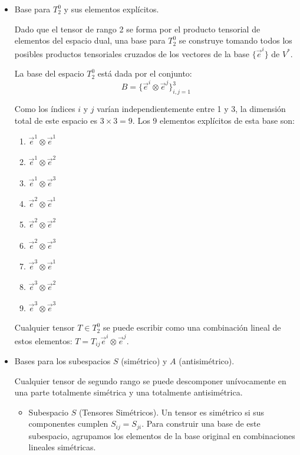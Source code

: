 \documentclass[11pt,spanish]{article}
\begin{document}
\begin{itemize}
\item[a)] Base para $T_2^0$ y sus elementos explícitos.

Dado que el tensor de rango 2 se forma por el producto tensorial de elementos del espacio dual, una base para $T_2^0$ se construye tomando todos los posibles productos tensoriales cruzados de los vectores de la base $\{\vec{e}^i\}$ de $V^*$.

La base del espacio $T_2^0$ está dada por el conjunto:
$$B = \{ \vec{e}^i \otimes \vec{e}^j \}_{i,j=1}^3$$

Como los índices $i$ y $j$ varían independientemente entre 1 y 3, la dimensión total de este espacio es $3 \times 3 = 9$. Los 9 elementos explícitos de esta base son:
\begin{enumerate}
\item $\vec{e}^1 \otimes \vec{e}^1$
\item $\vec{e}^1 \otimes \vec{e}^2$
\item $\vec{e}^1 \otimes \vec{e}^3$
\item $\vec{e}^2 \otimes \vec{e}^1$
\item $\vec{e}^2 \otimes \vec{e}^2$
\item $\vec{e}^2 \otimes \vec{e}^3$
\item $\vec{e}^3 \otimes \vec{e}^1$
\item $\vec{e}^3 \otimes \vec{e}^2$
\item $\vec{e}^3 \otimes \vec{e}^3$
\end{enumerate}

Cualquier tensor $T \in T_2^0$ se puede escribir como una combinación lineal de estos elementos: $T = T_{ij} \vec{e}^i \otimes \vec{e}^j$.

\item[b)] Bases para los subespacios $S$ (simétrico) y $A$ (antisimétrico).

Cualquier tensor de segundo rango se puede descomponer unívocamente en una parte totalmente simétrica y una totalmente antisimétrica. 

\begin{itemize}
\item Subespacio $S$ (Tensores Simétricos).
Un tensor es simétrico si sus componentes cumplen $S_{ij} = S_{ji}$. Para construir una base de este subespacio, agrupamos los elementos de la base original en combinaciones lineales simétricas. 


\end{itemize}
\end{itemize}
\end{document}
